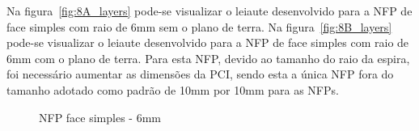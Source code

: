 Na figura~\ref{fig:8A_layers} pode-se visualizar o leiaute desenvolvido para a NFP de face simples com raio de 6mm sem o plano de terra. Na figura~\ref{fig:8B_layers} pode-se visualizar o leiaute desenvolvido para a NFP de face simples com raio de 6mm com o plano de terra. Para esta NFP, devido ao tamanho do raio da espira, foi necessário aumentar as dimensões da PCI, sendo esta a única NFP fora do tamanho adotado como padrão de 10mm por 10mm para as NFPs.
\begin{figure}[htb!]
	\centering
 	\caption{NFP face simples - 6mm}
	\subfloat[][FS60CT]{
}
\end{figure}
